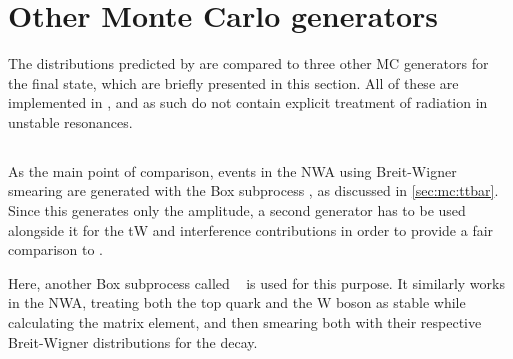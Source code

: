 \section{Other \ttbartitle Monte Carlo generators}
\label{sec:bb4l:others}

The distributions predicted by \bbfourl are compared to three other MC generators for the \tttW final state, which are briefly presented in this section. All of these are implemented in \powhegvtwo, and as such do not contain explicit treatment of radiation in unstable resonances.

\subsection{\texorpdfstring{\tttWsum}{tt+tW}}
\label{sec:bb4l:tttW}

As the main point of comparison, \ttbar events in the NWA using Breit-Wigner smearing are generated with the \powheg Box subprocess \hvq, as discussed in \cref{sec:mc:ttbar}. Since this generates only the \ttbar amplitude, a second generator has to be used alongside it for the tW and \tttW interference contributions in order to provide a fair comparison to \bbfourl.

Here, another \powheg Box subprocess called \ST~\cite{Re:2010bp} is used for this purpose. It similarly works in the NWA, treating both the top quark and the W boson as stable while calculating the matrix element, and then smearing both with their respective Breit-Wigner distributions for the decay.



